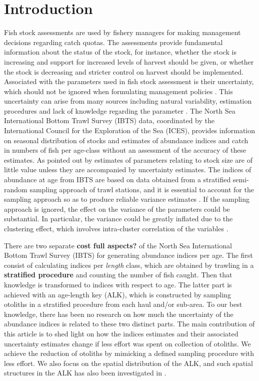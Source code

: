 \documentclass[a4paper 12pt]{article}
\numberwithin{equation}{section}
\begin{document}
\section{Introduction}
Fish stock assessments are used by fishery managers for making management decisions regarding catch quotas. The assessments provide fundamental information about the status of the stock, for instance, whether the stock is increasing and support for increased levels of harvest should be given, or whether the stock is decreasing and stricter control on harvest should be implemented. Associated with the parameters used in fish stock assessment is their uncertainty, which should not be ignored when formulating management policies \citep{walters1981effects, ludwig1981measurement}. This uncertainty can arise from many sources including natural variability, estimation procedures and lack of knowledge regarding the parameter \citep{ehrhardt1997role}. The North Sea International Bottom Trawl Survey (IBTS) data, coordinated by the International Council for the Exploration of the Sea (ICES), provides information on seasonal distribution of stocks and estimates of abundance indices and catch in numbers of fish per age-class without an assessment of the accuracy of these estimates.  As pointed out by  \citet{ludwig1981measurement} estimates of parameters relating to stock size are of little value unless they are accompanied by uncertainty estimates. The indices of abundance at age from IBTS  are based on data obtained from a stratified semi-random sampling approach of trawl stations,  and  it is essential to account for the sampling approach so as to produce reliable variance estimates \citep{lehtonen2004practical}. If the sampling approach is ignored, the effect on the variance  of the parameters could be substantial.  In particular, the variance could be greatly inflated  due to the clustering effect, which involves intra-cluster correlation of the variables \citep{aanes2015efficient, lehtonen2004practical}. 

There are two separate {\bf cost full aspects?} of the North Sea International Bottom Trawl Survey (IBTS) for generating abundance indices per age.  The first consist of calculating indices per \textit{length} class, which are obtained by trawling in a {\bf stratified procedure} and counting the number of fish caught. Then that knowledge is transformed to indices with respect to age. The latter part is achieved with an age-length key (ALK), which is constructed by sampling otoliths in a stratified procedure from each haul and/or sub-area. To our best knowledge, there has been no research on how much the uncertainty of the abundance indices is related to these two distinct parts. The main contribution of this article is to shed light on how the indices estimates and their associated uncertainty estimates change if less effort was spent on collection of otoliths. We achieve the reduction of otoliths by mimicking a defined sampling procedure with less effort. We also focus on the spatial distribution of the ALK, and such spatial structures in the ALK has also been investigated in \citet{berg2012spatial, hirst2012bayesian}.
\end{document}
